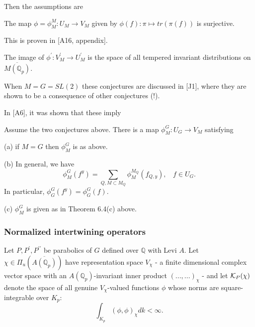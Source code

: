 Then the assumptions are

\begin{conjecture}
The map $\phi =\phi_M^M :U_M\rightarrow V_M$ given by
$\phi (f):\pi \longmapsto tr(\pi (f)) $ is surjective.
\end{conjecture}

This is proven in [A16, appendix].

\begin{conjecture}
The image of $\phi ^{\prime }:V_M^{\prime }\rightarrow U_M^{\prime }$ is the
space of all tempered invariant distributions on
$\overline{M({\mathbb{Q}}_p)}$.
\end{conjecture}

When $M=G=SL(2)$ these conjectures are discussed in [J1], where
they are shown to be a consequence of other conjectures (!).

In [A6], it was shown that these imply
\begin{theorem} Assume the two conjectures above.
There is a map
$\phi^G_M :U_G\rightarrow V_M$ satisfying

(a) if $M=G$ then $\phi_M^G$ is as above.

(b) In general, we have
\[
\phi_M^G(f^y)=
\sum_{ Q , M\subset M_Q}
\phi_M^{M_Q}(f_{Q,y}),\ \ \ \ f\in U_G.
\]
In particular, $\phi_G^G(f^y)=\phi_G^G(f)$.

(c) $\phi_M^G$ is given as in Theorem 6.4(c) above.
\end{theorem}

\subsubsection{Normalized intertwining operators}

Let $P,P^{\prime },P^{\prime \prime }$ be parabolics of
$G$ defined over ${\mathbb{Q}}$
with Levi $A$. Let $\chi \in \Pi _u({\overline{A({\mathbb{Q}}_p)}})$ have
representation space $V_\chi $ - a finite dimensional complex vector space
with an ${A({\mathbb {Q}}_p)}$-invariant inner product
$(...,...)_\chi $ - and let ${\cal{K}}_P(\chi )$ denote the space of all
genuine $V_\chi $-valued functions $\phi $
whose norms are square-integrable over
${K_p}$: 
\[
\int_{K_p}(\phi ,\phi )_\chi dk<\infty . 
\]

